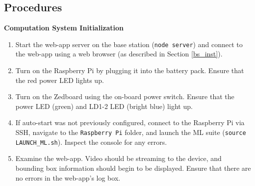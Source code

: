 
\newcommand{\checkbox}{\makebox[3ex][r]{\Large{$\square$}}}

\newenvironment{checklist}[1]{%
  \renewcommand{\item}[2]{%
    ##1\dotfill\makebox{\uppercase{##2}}\\
  }
  \newcommand{\step}[1]{%
    \hspace*{10em}-\hspace*{\labelsep}##1\\
  }
  \begin{tabular}{p{0.9\linewidth}}
     \toprule
       \multicolumn{1}{c}{\textbf{\uppercase{#1}}}\\
     \midrule
}{\bottomrule\end{tabular}\vspace{1em}}


\subsection{Procedures}

\textbf{Computation System Initialization}
\begin{enumerate}
\item Start the web-app server on the base station (\texttt{node server}) and connect to the web-app using a web browser (as described in Section \ref{bs_inst}).
\item Turn on the Raspberry Pi by plugging it into the battery pack. Ensure that the red power LED lights up.
\item Turn on the Zedboard using the on-board power switch. Ensure that the power LED (green) and LD1-2 LED (bright blue) light up.
\item If auto-start was not previously configured, connect to the Raspberry Pi via SSH, navigate to the \texttt{Raspberry Pi} folder, and launch the ML suite (\texttt{source LAUNCH\_ML.sh}). Inspect the console for any errors.
\item Examine the web-app. Video should be streaming to the device, and bounding box information should begin to be displayed. Ensure that there are no errors in the web-app's log box.
\end{enumerate}

